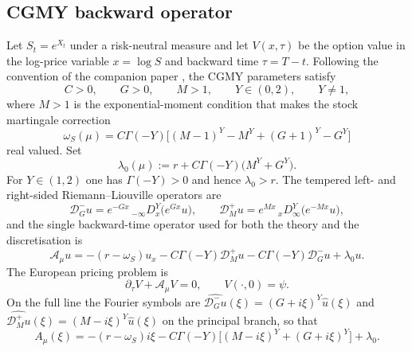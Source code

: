 \documentclass[11pt]{amsart}
\theoremstyle{remark}
\newcommand{\rf}{r}
\newcommand{\Dm}{\mathcal D_G^-}
\newcommand{\Dp}{\mathcal D_M^+}
\newcommand{\Aop}{\mathcal A_\mu}
\begin{document}
\subsection{CGMY backward operator}
\label{ssec:operator}

Let $S_t=e^{X_t}$ under a risk-neutral measure and let $V(x,\tau)$ be the
option value in the log-price variable $x=\log S$ and backward time
$\tau=T-t$.  Following the convention of the companion paper
\cite{DamircheliCGMY2026}, the CGMY parameters satisfy
\begin{equation}
  C>0,\qquad G>0,\qquad M>1,\qquad Y\in(0,2),\qquad Y\ne1,
  \label{eq:cgmy-parameters}
\end{equation}
where $M>1$ is the exponential-moment condition that makes the stock
martingale correction
\begin{equation}
  \omega_S(\mu)
  = C\Gamma(-Y)\bigl[(M-1)^Y-M^Y+(G+1)^Y-G^Y\bigr]
  \label{eq:martingale-correction}
\end{equation}
real valued.  Set
\begin{equation}
  \lambda_0(\mu) := \rf + C\Gamma(-Y)\bigl(M^Y+G^Y\bigr).
  \label{eq:lambda0}
\end{equation}
For $Y\in(1,2)$ one has $\Gamma(-Y)>0$ and hence $\lambda_0>\rf$.  The
tempered left- and right-sided Riemann--Liouville operators are
\begin{equation}
  \Dm u=e^{-Gx}\,{}_{-\infty}D_x^Y\bigl(e^{Gx}u\bigr),
  \qquad
  \Dp u=e^{Mx}\,{}_{x}D_\infty^Y\bigl(e^{-Mx}u\bigr),
  \label{eq:tempered-ops}
\end{equation}
and the single backward-time operator used for both the theory and the
discretisation is
\begin{equation}
  \Aop u
  =-(\rf-\omega_S)u_x
   -C\Gamma(-Y)\Dp u
   -C\Gamma(-Y)\Dm u
   +\lambda_0u.
  \label{eq:cgmy-operator}
\end{equation}
The European pricing problem is
\begin{equation}
  \partial_\tau V+\Aop V=0,
  \qquad
  V(\cdot,0)=\psi.
  \label{eq:pricing-pide}
\end{equation}
On the full line the Fourier symbols are
$\widehat{\Dm u}(\xi)=(G+i\xi)^Y\widehat u(\xi)$ and
$\widehat{\Dp u}(\xi)=(M-i\xi)^Y\widehat u(\xi)$ on the principal branch, so
that
\begin{equation}
  A_\mu(\xi)
  =-(\rf-\omega_S)i\xi
   -C\Gamma(-Y)\bigl[(M-i\xi)^Y+(G+i\xi)^Y\bigr]
   +\lambda_0 .
  \label{eq:symbol}
\end{equation}
\end{document}
